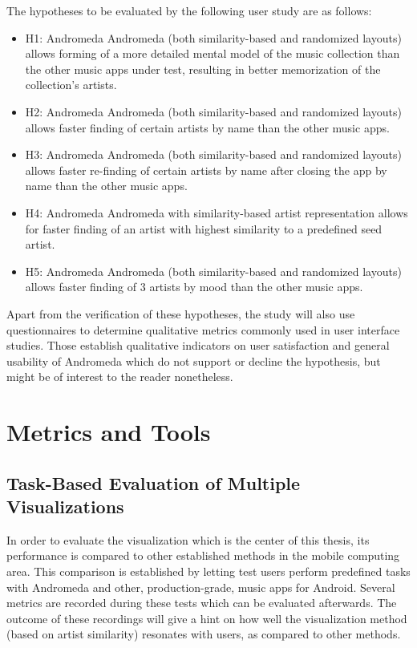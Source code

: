 The hypotheses to be evaluated by the following user study are as follows:

\begin{itemize}
	\item H1: Andromeda Andromeda (both similarity-based and randomized layouts) allows forming of a more detailed mental model of the music collection than the other music apps under test, resulting in better memorization of the collection's artists.
	\item H2: Andromeda Andromeda (both similarity-based and randomized layouts) allows faster finding of certain artists by name than the other music apps.
	\item H3: Andromeda Andromeda (both similarity-based and randomized layouts) allows faster re-finding of certain artists by name after closing the app by name than the other music apps.
	\item H4: Andromeda Andromeda with similarity-based artist representation allows for faster finding of an artist with highest similarity to a predefined seed artist.
	\item H5: Andromeda Andromeda (both similarity-based and randomized layouts) allows faster finding of 3 artists by mood than the other music apps.
\end{itemize}

Apart from the verification of these hypotheses, the study will also use questionnaires to determine qualitative metrics commonly used in user interface studies. Those establish qualitative indicators on user satisfaction and general usability of Andromeda which do not support or decline the hypothesis, but might be of interest to the reader nonetheless.

\section{Metrics and Tools}

\subsection{Task-Based Evaluation of Multiple Visualizations}

In order to evaluate the visualization which is the center of this thesis, its performance is compared to other established methods in the mobile computing area. This comparison is established by letting test users perform predefined tasks with Andromeda and other, production-grade, music apps for Android. Several metrics are recorded during these tests which can be evaluated afterwards. The outcome of these recordings will give a hint on how well the visualization method (based on artist similarity) resonates with users, as compared to other methods.

